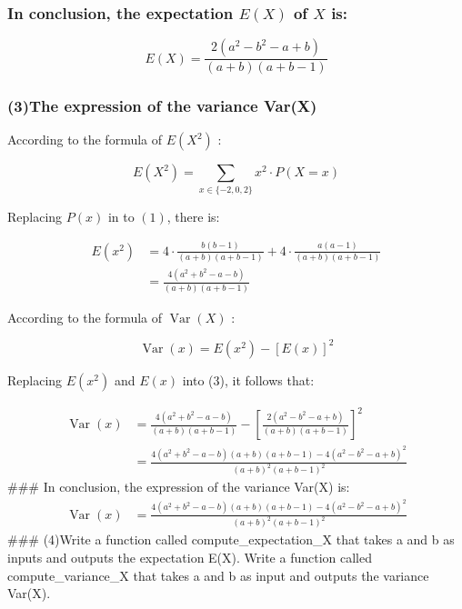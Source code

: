 \documentclass[
]{article}
\begin{document}
\subsubsection{\texorpdfstring{In conclusion, the expectation \(E(X)\)
of \(X\)
is:}{In conclusion, the expectation E(X) of X is:}}\label{in-conclusion-the-expectation-ex-of-x-is}

\[
E(X)=\frac{2\left(a^{2}-b^{2}-a+b\right)}{(a+b)(a+b-1)}
\]

\subsubsection{(3)The expression of the variance
Var(X)}\label{the-expression-of-the-variance-varx}

According to the formula of \(E\left(X^{2}\right)\) :

\[
\begin{equation}
E\left(X^{2}\right)=\sum_{x \in\{-2,0,2\}} x^{2} \cdot P(X=x) \tag{1}
\end{equation}
\]

Replacing \(P(x)\) in to \((1)\), there is:

\[
\begin{align*}
E\left(x^{2}\right) & =4 \cdot \frac{b(b-1)}{(a+b)(a+b-1)}+4 \cdot \frac{a(a-1)}{(a+b)(a+b-1)} \\
& =\frac{4\left(a^{2}+b^{2}-a-b\right)}{(a+b)(a+b-1)} \tag{2}
\end{align*}
\]

According to the formula of \(\operatorname{Var}(X)\) :

\[
\begin{equation}
\operatorname{Var}(x)=E\left(x^{2}\right)-[E(x)]^{2} \tag{3}
\end{equation}
\]

Replacing \(E\left(x^{2}\right)\) and \(E(x)\) into (3), it follows
that:

\[
\begin{aligned}
\operatorname{Var}(x) & =\frac{4\left(a^{2}+b^{2}-a-b\right)}{(a+b)(a+b-1)}-\left[\frac{2\left(a^{2}-b^{2}-a+b\right)}{(a+b)(a+b-1)}\right]^{2} \\
& =\frac{4\left(a^{2}+b^{2}-a-b\right)(a+b)(a+b-1)-4\left(a^{2}-b^{2}-a+b\right)^{2}}{(a+b)^{2}(a+b-1)^{2}}
\end{aligned}
\] \#\#\# In conclusion, the expression of the variance Var(X) is:\\
\[
\begin{aligned}
\operatorname{Var}(x) & =\frac{4\left(a^{2}+b^{2}-a-b\right)(a+b)(a+b-1)-4\left(a^{2}-b^{2}-a+b\right)^{2}}{(a+b)^{2}(a+b-1)^{2}}
\end{aligned}
\] \#\#\# (4)Write a function called compute\_expectation\_X that takes
a and b as inputs and outputs the expectation E(X). Write a function
called compute\_variance\_X that takes a and b as input and outputs the
variance Var(X).
\end{document}
